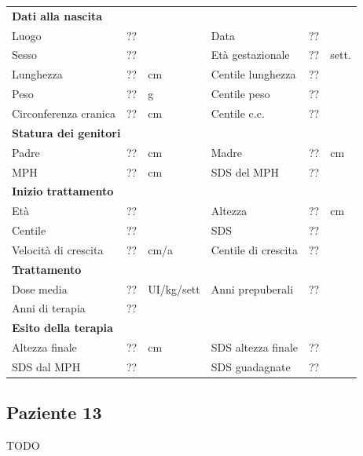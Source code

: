 \begin{table}[!h]
\begin{tabular}{lrllrl}
\toprule
\multicolumn{6}{l}{\textbf{Dati alla nascita}}\\
Luogo 		& \multicolumn{2}{l}{??} 	& Data 					& \multicolumn{2}{l}{??} 	\\
Sesso 		& \multicolumn{2}{l}{??} 	& Età gestazionale 		& ?? 		& sett.\\
Lunghezza 	& ?? 		& cm 				& Centile lunghezza		& ?? 		\\
Peso 		& ?? 		& g					& Centile peso			& ?? 		\\
Circonferenza cranica	& ?? 		& cm 	& Centile c.c.			& ?? \\
\midrule
\multicolumn{6}{l}{\textbf{Statura dei genitori}}\\
Padre 		& ?? & cm 	& Madre 				& ?? & cm \\
MPH 		& ?? & cm 	& SDS del MPH 			& ??\\
\midrule
\multicolumn{6}{l}{\textbf{Inizio trattamento}} \\
Età	& ?? & 		& Altezza 				& ?? & cm  \\
Centile & ?? 	 &		& SDS		& ?? \\
Velocità di crescita & ?? & cm/a	& Centile di crescita & ??\\
\midrule
\multicolumn{6}{l}{\textbf{Trattamento}} \\
Dose media		& ?? & UI/kg/sett & Anni prepuberali & ??\\
Anni di terapia & ??\\
\midrule
\multicolumn{6}{l}{\textbf{Esito della terapia}} \\
Altezza finale			& ?? & cm 	& SDS altezza finale		& ??\\
SDS dal MPH				& ?? &		& SDS guadagnate 			& ??\\
\bottomrule
\end{tabular}
\end{table}
\clearpage


\subsection*{Paziente 13}

TODO

